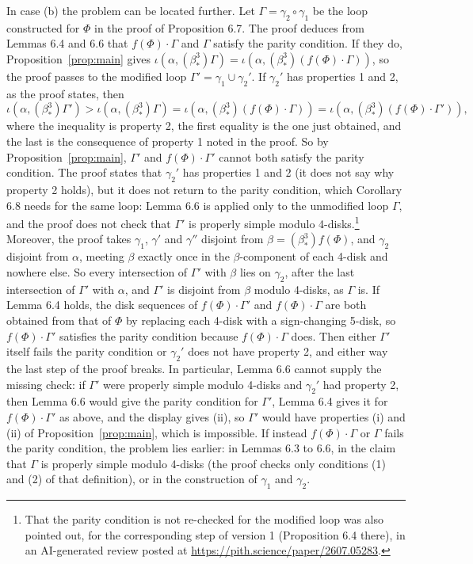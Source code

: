 \documentclass[11pt]{amsart}
\theoremstyle{remark}
\newcommand{\bs}{\beta^3_*}
\begin{document}
In case (b) the problem can be located further. Let $\Gamma=\gamma_2\circ\gamma_1$ be the loop constructed for $\Phi$ in the proof of Proposition 6.7. The proof deduces from Lemmas 6.4 and 6.6 that $f(\Phi)\cdot\Gamma$ and $\Gamma$ satisfy the parity condition. If they do, Proposition~\ref{prop:main} gives $\iota(\alpha,(\bs)\Gamma)=\iota(\alpha,(\bs)(f(\Phi)\cdot\Gamma))$, so the proof passes to the modified loop $\Gamma'=\gamma_1\cup\gamma_2'$. If $\gamma_2'$ has properties 1 and 2, as the proof states, then
\[
\iota(\alpha,(\bs)\Gamma')>\iota(\alpha,(\bs)\Gamma)=\iota(\alpha,(\bs)(f(\Phi)\cdot\Gamma))=\iota(\alpha,(\bs)(f(\Phi)\cdot\Gamma')),
\]
where the inequality is property 2, the first equality is the one just obtained, and the last is the consequence of property 1 noted in the proof. So by Proposition~\ref{prop:main}, $\Gamma'$ and $f(\Phi)\cdot\Gamma'$ cannot both satisfy the parity condition. The proof states that $\gamma_2'$ has properties 1 and 2 (it does not say why property 2 holds), but it does not return to the parity condition, which Corollary 6.8 needs for the same loop: Lemma 6.6 is applied only to the unmodified loop $\Gamma$, and the proof does not check that $\Gamma'$ is properly simple modulo 4-disks.\footnote{That the parity condition is not re-checked for the modified loop was also pointed out, for the corresponding step of version 1 (Proposition 6.4 there), in an AI-generated review posted at \url{https://pith.science/paper/2607.05283}.} Moreover, the proof takes $\gamma_1$, $\gamma'$ and $\gamma''$ disjoint from $\beta=(\bs)f(\Phi)$, and $\gamma_2$ disjoint from $\alpha$, meeting $\beta$ exactly once in the $\beta$-component of each 4-disk and nowhere else. So every intersection of $\Gamma'$ with $\beta$ lies on $\gamma_2$, after the last intersection of $\Gamma'$ with $\alpha$, and $\Gamma'$ is disjoint from $\beta$ modulo 4-disks, as $\Gamma$ is. If Lemma 6.4 holds, the disk sequences of $f(\Phi)\cdot\Gamma'$ and $f(\Phi)\cdot\Gamma$ are both obtained from that of $\Phi$ by replacing each 4-disk with a sign-changing 5-disk, so $f(\Phi)\cdot\Gamma'$ satisfies the parity condition because $f(\Phi)\cdot\Gamma$ does. Then either $\Gamma'$ itself fails the parity condition or $\gamma_2'$ does not have property 2, and either way the last step of the proof breaks. In particular, Lemma 6.6 cannot supply the missing check: if $\Gamma'$ were properly simple modulo 4-disks and $\gamma_2'$ had property 2, then Lemma 6.6 would give the parity condition for $\Gamma'$, Lemma 6.4 gives it for $f(\Phi)\cdot\Gamma'$ as above, and the display gives (ii), so $\Gamma'$ would have properties (i) and (ii) of Proposition~\ref{prop:main}, which is impossible. If instead $f(\Phi)\cdot\Gamma$ or $\Gamma$ fails the parity condition, the problem lies earlier: in Lemmas 6.3 to 6.6, in the claim that $\Gamma$ is properly simple modulo 4-disks (the proof checks only conditions (1) and (2) of that definition), or in the construction of $\gamma_1$ and $\gamma_2$.
\end{document}
